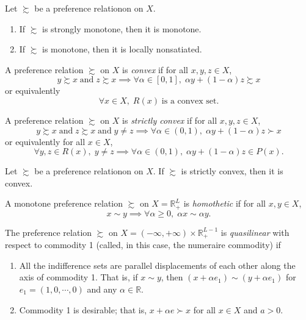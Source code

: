 \documentclass[12pt,fleqn]{book} %
\begin{document}
\begin{proposition}
	Let $\succsim$ be a preference relationon on $X$.
	\begin{enumerate}	
		\item If $\succsim$ is strongly monotone, then it is monotone.	
		\item If $\succsim$ is monotone, then it is locally nonsatiated.		 
	\end{enumerate}
\end{proposition}

\begin{definition}[Convexity]
	A preference relation $\succsim$ on $X$ is \emph{convex} if for all $x,y,z\in X$,
	\[
    y\succsim x\;\text{and}\;z\succsim x\implies \forall\alpha\in[0,1],\;\alpha y+(1-\alpha)z\succsim x
    \]
	or equivalently
	\[
	\forall x\in X,\;R(x)\;\text{is a convex set}.
	\]
\end{definition}

\begin{definition}
	A preference relation $\succsim$ on $X$ is \emph{strictly convex} if for all $x,y,z\in X$,
	\[
	y\succsim x\;\text{and}\;z\succsim x\;\text{and}\;y\ne z\implies \forall\alpha\in(0,1),\;\alpha y+(1-\alpha)z\succ x
	\]
	or equivalently for all $x\in X$,
	\[
	\forall y,z\in R(x),\;y\ne z\implies\forall\alpha\in(0,1),\;\alpha y+(1-\alpha)z\in P(x).
	\]
\end{definition}

\begin{proposition}
	Let $\succsim$ be a preference relationon on $X$. If $\succsim$ is strictly convex, then it is convex.	
\end{proposition}

\begin{definition}
    A monotone preference relation $\succsim$ on $X=\mathbb{R}_+^L$ is \emph{homothetic} if for all $x,y\in X$,
    \[
    x\sim y \implies \forall \alpha\geqslant 0,\;\alpha x\sim\alpha y.
    \]
\end{definition}

\begin{definition}
	The preference relation $\succsim$ on $X=(-\infty,+\infty)\times\mathbb{R}_+^{L-1}$ is \emph{quasilinear}
	with respect to commodity 1 (called, in this case, the numeraire commodity) if
	\begin{enumerate}
		\item All the indifference sets are parallel displacements of each other along the	axis of commodity 1. That is, if $x \sim y$, then $(x + \alpha e_1) \sim (y + \alpha e_1)$ for $e_1=(1,0,\cdots,0)$ and any $\alpha\in\mathbb{R}$.
		\item Commodity 1 is desirable; that is, $x +\alpha e\succ x$ for all $x\in X$ and $a > 0$.
	\end{enumerate}
\end{definition}
\end{document}

